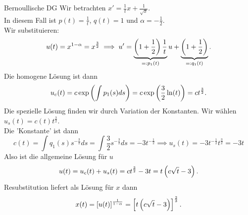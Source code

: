 \begin{Beispiel}
{Bernoullische DG}
Wir betrachten $\boxed{x'=\frac{1}{t}x+\frac{1}{\sqrt{x}}}$.\\
In diesem Fall ist $p(t)=\frac{1}{t}$, $q(t)=1$ und $\alpha=-\frac{1}{2}$.\\
Wir substituieren:
\begin{equation*}
    u(t)=x^{1-\alpha}=x^\frac{3}{2}\implies u'=\underbrace{\left({1+\frac{1}{2}}\right)\frac{1}{t}}_{=:p_1(t)}u+\underbrace{\left({1+\frac{1}{2}}\right)}_{=:q_1(t)}.
\end{equation*}
Die homogene Lösung ist dann
\begin{equation*}
    u_c(t)=c\exp\left({\int p_1(s)ds}\right)=c\exp\left({\frac{3}{2}\ln(t)}\right)=ct^\frac{3}{2}.
\end{equation*}
Die spezielle Lösung finden wir durch Variation der Konstanten. Wir wählen $u_s(t)=c(t)t^\frac{3}{2}$.\\
Die 'Konstante' ist dann
\begin{equation*}
    c(t)=\int q_1(s)s^{-\frac{3}{2}}ds=\int \frac{3}{2}s^{-\frac{3}{2}}ds=-3t^{-\frac{1}{2}}\implies u_s(t)=-3t^{-\frac{1}{2}}t^\frac{3}{2}=-3t
\end{equation*}
Also ist die allgemeine Lösung für $u$
\begin{equation*}
    u(t)=u_c(t)+u_s(t)=ct^\frac{3}{2}-3t=t\left({c\sqrt{t}-3}\right).
\end{equation*}
Resubstitution liefert als Lösung für $x$ dann
\begin{equation*}
    x(t)=\left[{u(t)}\right]^\frac{1}{1-\alpha}=\left[{t\left({c\sqrt{t}-3}\right)}\right]^\frac{2}{3}.
\end{equation*}
\end{Beispiel}


